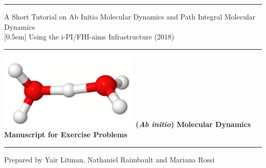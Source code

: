 \documentclass[a4paper,11pt]{scrartcl}
\begin{document}
\thispagestyle{empty}
\begin{center}\huge\bfseries
  \rule{1.0\textwidth}{1pt}
 A Short Tutorial on Ab Initio Molecular Dynamics and Path Integral Molecular Dynamics \\
[0.5em] Using the i-PI/FHI-aims Infrastructure (2018)
  \rule{1.0\textwidth}{1pt}
\end{center}
\vfill
\begin{center}\LARGE\bfseries
  \includegraphics[width=0.5\textwidth]{H5O2.png}
  \vfill\vfill
 (\textit{Ab initio}) Molecular Dynamics\\
  Manuscript for Exercise Problems
\end{center}
\vfill
\begin{center}\large\bfseries
  \rule{1.0\textwidth}{1pt}
  \vfill
  Prepared by Yair Litman, Nathaniel Raimbault and Mariana Rossi\\[0.4em]
\end{center}

\clearpage




%
%
%
%

\end{document}

